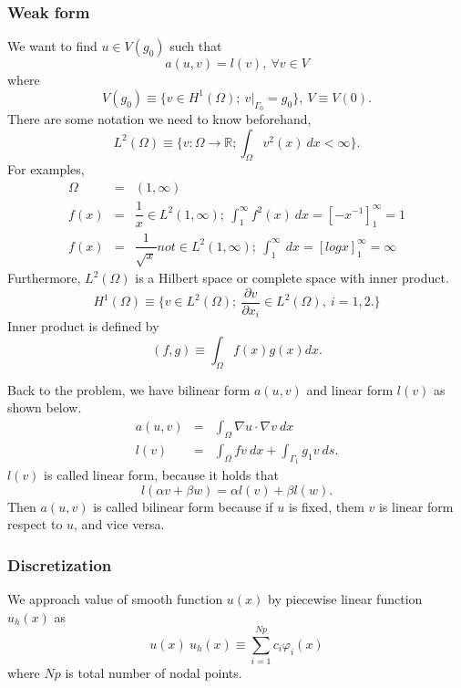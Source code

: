 \documentclass[a4paper,10pt]{article}
\begin{document}
\subsubsection{Weak form}
We want to find $ u \in V(g_{0}) $ such that
\begin{equation*}
a(u,v) = l(v) , \ \forall v \in V
\end{equation*}
where 
\begin{equation*}
V(g_{0}) \equiv \{ v \in H^{1}(\Omega) ; \ v|_{\Gamma_{0}}=g_{0} \}, \ V \equiv V(0).
\end{equation*}
There are some notation we need to know beforehand,
\begin{equation*}
L^{2}(\Omega) \equiv \{ v : \Omega \rightarrow \mathbb{R} ; \int_{\Omega} v^{2}(x) \ dx < \infty \}.
\end{equation*}
For examples,
\begin{eqnarray}\nonumber
\Omega &=& (1,\infty) \\ \nonumber
f(x) &=& \dfrac{1}{x}　\in L^{2}(1, \infty) ; \ \int_{1}^{\infty} f^{2}(x) \ dx = [ -x^{-1} ]^{\infty}_{1} =1 \\ \nonumber
f(x) &=& \dfrac{1}{\sqrt{x}} not \in L^{2}(1,\infty); \ \int_{1}^{\infty} \ dx = [log x]_{1}^{\infty} = \infty
\end{eqnarray}
Furthermore, $ L^2(\Omega) $ is a Hilbert space or complete space with inner product. 
\begin{equation*}
H^{1}(\Omega) \equiv \{ v \in L^2(\Omega); \ \dfrac{\partial v}{\partial x_{i}} \in L^2(\Omega), \ i=1,2. \}
\end{equation*}
Inner product is defined by
\[ (f,g) \equiv \int_{\Omega} f(x) g(x) dx. \]

Back to the problem, we have bilinear form $ a(u,v) $ and linear form $ l(v) $ as shown below.
\begin{eqnarray}\nonumber
a(u,v) &=&  \int_{\Omega} \nabla u \cdot \nabla v \ dx \\ \nonumber
l(v) &=& \int_{\Omega} f v \ dx + \int_{\Gamma_{1}} g_{1} v \ ds.
\end{eqnarray}
$ l(v) $ is called linear form, because it holds that
\[ l(\alpha v + \beta w) = \alpha l(v) + \beta l(w). \]
Then $ a(u,v) $ is called bilinear form because if $ u $ is fixed, them $ v $ is linear form respect to $ u $, and vice versa.

\subsubsection{Discretization}
We approach value of smooth function $ u(x) $ by piecewise linear function $ u_{h}(x) $ as
\[ u(x) ~ u_{h}(x) \equiv \sum_{i=1}^{Np} c_{i} \varphi_{i}(x) \]
where $ Np $ is total number of nodal points.
\end{document}
